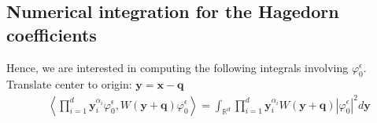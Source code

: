 \usepackage{amsmath}
\usepackage{pgfplots}
\pgfplotsset{compat=1.11}


\subsection{Numerical integration for the Hagedorn coefficients}
Hence, we are interested in computing the following integrals 
involving $\varphi_0^\epsilon$. Translate center to origin: 
$\bm{y} = \bm{x} - \bm{q}$ 
\begin{equation}
  \begin{split}
    &\left \langle
      \prod_{i = 1}^d \bm{y}^{\alpha_i}_{i} \varphi^\epsilon_{0},
      W(\bm{y} + \bm{q}) \varphi^\epsilon_{0}
  \right \rangle
  = \int_{\mathbb{R}^d}
  \prod_{i = 1}^d \bm{y}^{\alpha_i}_{i} 
  W(\bm{y + q}) |\varphi^\epsilon_0|^2 d \bm{y}
\end{split}
\end{equation}
